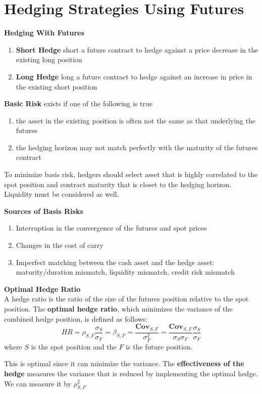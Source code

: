 \documentclass[11pt,fleqn]{report} %
\numberwithin{equation}{section} %
\numberwithin{figure}{section} %
\numberwithin{table}{section} %
\begin{document}
\chapter{Hedging Strategies Using Futures}
\begin{definition}\textbf{Hedging With Futures}
\begin{enumerate}
    \item \textbf{Short Hedge} short a future contract to hedge against a price decrease in the existing long position
    \item \textbf{Long Hedge} long a future contract to hedge against an increase in price in the existing short position
\end{enumerate}
\end{definition}
\begin{definition}\textbf{Basic Risk} exists if one of the following is true
\begin{enumerate}
    \item the asset in the existing position is often not the same as that underlying the futures
    \item the hedging horizon may not match perfectly with the maturity of the futures contract
\end{enumerate}
\end{definition}
\begin{remark}
To minimize basis risk, hedgers should select asset that is highly correlated to the spot position and contract maturity that is closet to the hedging horizon. Liquidity must be considered as well.
\end{remark}
\begin{definition}\textbf{Sources of Basis Risks}
\begin{enumerate}
    \item Interruption in the convergence of the futures and spot prices
    \item Changes in the cost of carry
    \item Imperfect matching between the cash asset and the hedge asset: maturity/duration mismatch, liquidity mismatch, credit risk mismatch
\end{enumerate}
\end{definition}
\begin{theorem}\textbf{Optimal Hedge Ratio}\\
A hedge ratio is the ratio of the size of the futures position relative to the spot position. The \textbf{optimal hedge ratio}, which minimizes the variance of the combined hedge position, is defined as follows:
$$
HR=\rho_{S,F}\frac{\sigma_S}{\sigma_F}=\beta_{S,F}=\frac{\textbf{Cov}_{S,F}}{\sigma_F^2}=\frac{\textbf{Cov}_{S,F}}{\sigma_S\sigma_F}\frac{\sigma_S}{\sigma_F}
$$
where $S$ is the spot position and the $F$ is the future position.
\end{theorem}
\begin{remark}
This is optimal since it can minimize the variance. The \textbf{effectiveness of the hedge} measures the variance that is reduced by implementing the optimal hedge. We can measure it by $\rho_{S,F}^2$
\end{remark}
\end{document}
